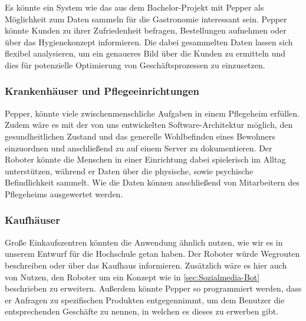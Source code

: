 Es könnte ein System wie das aus dem Bachelor-Projekt mit Pepper als Möglichkeit zum Daten sammeln für die Gastronomie interessant sein. Pepper könnte Kunden zu ihrer Zufriedenheit befragen, Bestellungen aufnehmen oder über das Hygienekonzept informieren. Die dabei gesammelten Daten lassen sich flexibel analysieren, um ein genaueres Bild über die Kunden zu ermitteln und dies für potenzielle Optimierung von Geschäftsprozessen zu einzusetzen.\\

\subsubsection{Krankenhäuser und Pflegeeinrichtungen}

Pepper, könnte viele zwischenmenschliche Aufgaben in einem Pflegeheim erfüllen. Zudem wäre es mit der von uns entwickelten Software-Architektur möglich, den gesundheitlichen Zustand und das generelle Wohlbefinden eines Bewohners einzuordnen und anschließend zu auf einem Server zu dokumentieren. Der Roboter könnte die Menschen in einer Einrichtung dabei spielerisch im Alltag unterstützen, während er Daten über die physische, sowie psychische Befindlichkeit sammelt. Wie die Daten können anschließend von Mitarbeitern des Pflegeheims ausgewertet werden.\\

\subsubsection{Kaufhäuser}

Große Einkaufszentren könnten die Anwendung ähnlich nutzen, wie wir es in unserem Entwurf für die Hochschule getan haben. Der Roboter würde Wegrouten beschreiben oder über das Kaufhaus informieren. Zusätzlich wäre es hier auch von Nutzen, den Roboter um ein Konzept wie in \ref{sec:Sozialmedia-Bot} beschrieben zu erweitern. Außerdem könnte Pepper so programmiert werden, dass er Anfragen zu spezifischen Produkten entgegennimmt, um dem Benutzer die entsprechenden Geschäfte zu nennen, in welchen es dieses zu erwerben gibt.\\
